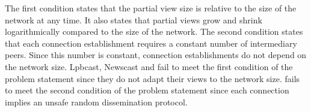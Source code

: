 The first condition states that the partial view size is relative to the size
of the network at any time. It also states that partial views grow and shrink
logarithmically compared to the size of the network. The second condition
states that each connection establishment requires a constant number of
intermediary peers. Since this number is constant, connection establishments
do not depend on the network size.
Lpbcast, Newscast and \CYCLON fail to meet the first condition of the problem
statement since they do not adapt their views to the network size. \SCAMP fails
to meet the second condition of the problem statement since each connection
implies an unsafe random dissemination protocol.

